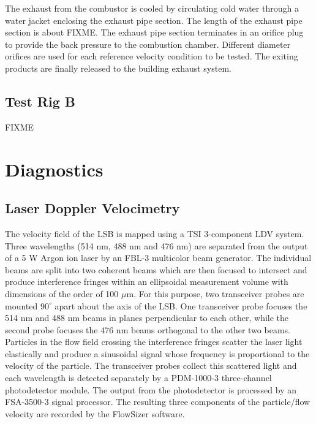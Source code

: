 The exhaust from the combustor is cooled by circulating cold water through a water jacket enclosing the exhaust pipe section.
The length of the exhaust pipe section is about FIXME.
The exhaust pipe section terminates in an orifice plug to provide the back pressure to the combustion chamber.
Different diameter orifices are used for each reference velocity condition to be tested.
The exiting products are finally released to the building exhaust system.

\subsection{Test Rig B}

FIXME

\section{Diagnostics}

\subsection{Laser Doppler Velocimetry}

The velocity field of the LSB is mapped using a TSI 3-component LDV system.
Three wavelengths (514 nm, 488 nm and 476 nm) are separated from the output of a 5 W Argon ion laser by an FBL-3 multicolor beam generator.
The individual beams are split into two coherent beams which are then focused to intersect and produce interference fringes within an ellipsoidal measurement volume with dimensions of the order of 100 \(\mu\)m.
For this purpose, two transceiver probes are mounted \(90^\circ\) apart about the axis of the LSB.
One transceiver probe focuses the 514 nm and 488 nm beams in planes perpendicular to each other, while the second probe focuses the 476 nm beams orthogonal to the other two beams.
Particles in the flow field crossing the interference fringes scatter the laser light elastically and produce a sinusoidal signal whose frequency is proportional to the velocity of the particle.
The transceiver probes collect this scattered light and each wavelength is detected separately by a PDM-1000-3 three-channel photodetector module.
The output from the photodetector is processed by an FSA-3500-3 signal processor.
The resulting three components of the particle/flow velocity are recorded by the FlowSizer software.

